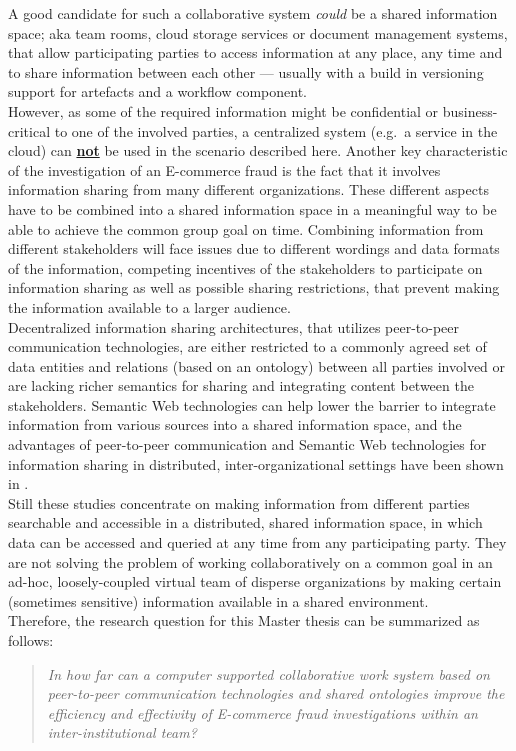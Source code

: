 A good candidate for such a collaborative system \textit{could} be a shared information space; aka team rooms, cloud storage services or document management systems, that allow participating parties to access information at any place, any time and to share information between each other --- usually with a build in versioning support for artefacts and a workflow component. \\

However, as some of the required information might be confidential or business-critical to one of the involved parties, a centralized system (e.g.\ a service in the cloud) can \textbf{\underline{not}} be used in the scenario described here. Another key characteristic of the investigation of an E-commerce fraud is the fact that it involves information sharing from many different organizations. These different aspects have to be combined into a shared information space in a meaningful way to be able to achieve the common group goal on time. Combining information from different stakeholders will face issues due to different wordings and data formats of the information, competing incentives of the stakeholders to participate on information sharing as well as possible sharing restrictions, that prevent making the information available to a larger audience. \\

Decentralized information sharing architectures, that utilizes peer-to-peer communication technologies, are either restricted to a commonly agreed set of data entities and relations (based on an ontology) between all parties involved or are lacking richer semantics for sharing and integrating content between the stakeholders. Semantic Web technologies can help lower the barrier to integrate information from various sources into a shared information space, and the advantages of peer-to-peer communication and Semantic Web technologies for information sharing in distributed, inter-organizational settings have been shown in \citep{Staab2006}. \\

Still these studies concentrate on making information from different parties searchable and accessible in a distributed, shared information space, in which data can be accessed and queried at any time from any participating party. They are not solving the problem of working collaboratively on a common goal in an ad-hoc, loosely-coupled virtual team of disperse organizations by making certain (sometimes sensitive) information available in a shared environment. \\

Therefore, the research question for this Master thesis can be summarized as follows: \@

\begin{quotation}
  \textit{In how far can a computer supported collaborative work system based on peer-to-peer communication technologies and shared ontologies improve the efficiency and effectivity of E-commerce fraud investigations within an inter-institutional team?}
\end{quotation}

